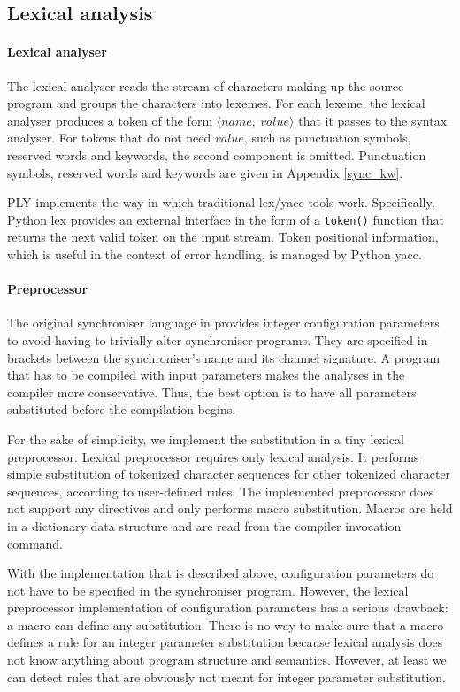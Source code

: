 \subsection{Lexical analysis}
  \paragraph{Lexical analyser}
The lexical analyser reads the stream of characters making up the source program and groups the characters into lexemes. For each lexeme, the lexical analyser produces a token of the form $\langle name, \: value \rangle$ that it passes to the syntax analyser. For tokens that do not need $value$, such as punctuation symbols, reserved words and keywords, the second component is omitted. Punctuation symbols, reserved words and keywords are given in Appendix \ref{sync_kw}.

PLY implements the way in which traditional lex/yacc tools work. Specifically, Python lex provides an external interface in the form of a \texttt{token()} function that returns the next valid token on the input stream. Token positional information, which is useful in the context of error handling, is managed by Python yacc.

  \paragraph{Preprocessor}
The original synchroniser language in \cite{astrakahn} provides integer configuration parameters to avoid having to trivially alter synchroniser programs. They are specified in brackets between the synchroniser's name and its channel signature. A program that has to be compiled with input parameters makes the analyses in the compiler more conservative. Thus, the best option is to have all parameters substituted before the compilation begins.

For the sake of simplicity, we implement the substitution in a tiny lexical preprocessor. Lexical preprocessor requires only lexical analysis. It performs simple substitution of tokenized character sequences for other tokenized character sequences, according to user-defined rules. The implemented preprocessor does not support any directives and only performs macro substitution. Macros are held in a dictionary data structure and are read from the compiler invocation command.

With the implementation that is described above, configuration parameters do not have to be specified in the synchroniser program. However, the lexical preprocessor implementation of configuration parameters has a serious drawback: a macro can define any substitution. There is no way to make sure that a macro defines a rule for an integer parameter substitution because lexical analysis does not know anything about program structure and semantics. However, at least we can detect rules that are obviously not meant for integer parameter substitution.


